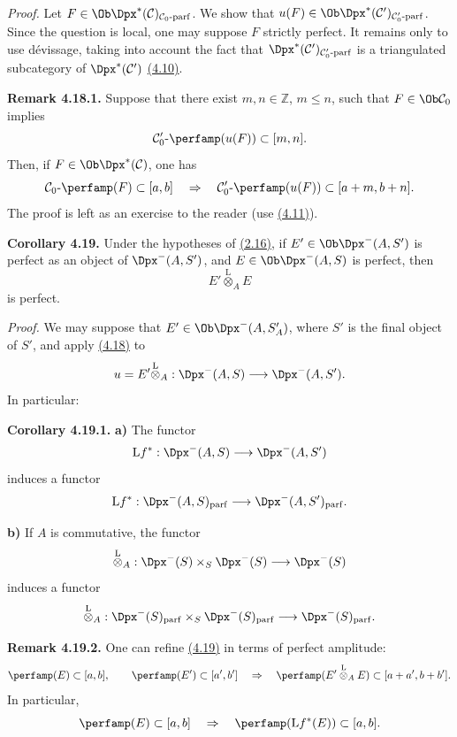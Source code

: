 \emph{Proof.} Let \(F\in\Ob\Dpx^*(\mathcal C)_{\mathcal C_0\text{-}\mathrm{parf}}\). We show that \(u(F)\in\Ob\Dpx^*(\mathcal C')_{\mathcal C'_0\text{-}\mathrm{parf}}\). Since the question is local, one may suppose \(F\) strictly perfect. It remains only to use dévissage, taking into account the fact that \(\Dpx^*(\mathcal C')_{\mathcal C'_0\text{-}\mathrm{parf}}\) is a triangulated subcategory of \(\Dpx^*(\mathcal C')\) \hyperlink{sga6.e01.prop.4-10}{(4.10)}.

\textbf{Remark 4.18.1.} Suppose that there exist \(m,n\in\mathbb Z\), \(m\leq n\), such that \(F\in\Ob\mathcal C_0\) implies
\[
  \mathcal C'_0\text{-}\perfamp(u(F))\subset[m,n].
\]
Then, if \(F\in\Ob\Dpx^*(\mathcal C)\), one has
\[
  \mathcal C_0\text{-}\perfamp(F)
  \subset [a,b]
  \quad\Rightarrow\quad
  \mathcal C'_0\text{-}\perfamp(u(F))
  \subset [a+m,b+n].
\]
The proof is left as an exercise to the reader (use \hyperlink{sga6.e01.complement.4-11}{(4.11)}).

\textbf{Corollary 4.19.} Under the hypotheses of \hyperlink{sga6.e01.cor.2-16}{(2.16)}, if \(E'\in\Ob\Dpx^-(A,S')\) is perfect as an object of \(\Dpx^-(A,S')\), and \(E\in\Ob\Dpx^-(A,S)\) is perfect, then
\[
  E'\overset{\mathrm L}{\otimes}_A E
\]
is perfect.

\emph{Proof.} We may suppose that \(E'\in\Ob\Dpx^-(A,S'_A)\), where \(S'\) is the final object of \(S'\), and apply \hyperlink{sga6.e01.prop.4-18}{(4.18)} to
\[
  u=E'\overset{\mathrm L}{\otimes}_A:
  \Dpx^-(A,S)\longrightarrow \Dpx^-(A,S').
\]
In particular:

\textbf{Corollary 4.19.1.} \textbf{a)} The functor
\[
  \mathrm L f^*:\Dpx^-(A,S)\longrightarrow \Dpx^-(A,S')
\]
induces a functor
\[
  \mathrm L f^*:\Dpx^-(A,S)_{\mathrm{parf}}
  \longrightarrow
  \Dpx^-(A,S')_{\mathrm{parf}}.
\]

\textbf{b)} If \(A\) is commutative, the functor
\[
  \overset{\mathrm L}{\otimes}_A:
  \Dpx^-(S)\times_S\Dpx^-(S)
  \longrightarrow \Dpx^-(S)
\]
induces a functor
\[
  \overset{\mathrm L}{\otimes}_A:
  \Dpx^-(S)_{\mathrm{parf}}\times_S\Dpx^-(S)_{\mathrm{parf}}
  \longrightarrow \Dpx^-(S)_{\mathrm{parf}}.
\]

\textbf{Remark 4.19.2.} One can refine \hyperlink{sga6.e01.cor.4-19}{(4.19)} in terms of perfect amplitude:
\[
  \perfamp(E)\subset[a,b],\qquad
  \perfamp(E')\subset[a',b']
  \quad\Rightarrow\quad
  \perfamp(E'\overset{\mathrm L}{\otimes}_A E)\subset[a+a',b+b'].
\]
In particular,
\[
  \perfamp(E)\subset[a,b]
  \quad\Rightarrow\quad
  \perfamp(\mathrm L f^*(E))\subset[a,b].
\]

